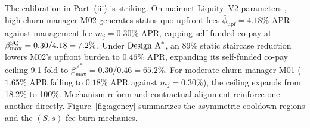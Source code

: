 The calibration in Part~(iii) is striking. On mainnet Liquity~V2 parameters \citep{companion2026}, high-churn manager M02 generates status quo upfront fees $\bar{\phi}_{\mathrm{upf}} = 4.18\%$ APR against management fee $m_j = 0.30\%$ APR, capping self-funded co-pay at $\beta_{\max}^{\mathrm{SQ}} = 0.30/4.18 = 7.2\%$. Under $\textup{Design A}^*$, an 89\% static staircase reduction lowers M02's upfront burden to $0.46\%$ APR, expanding its self-funded co-pay ceiling 9.1-fold to $\beta_{\max}^{A^*} = 0.30/0.46 = 65.2\%$. For moderate-churn manager M01 ($1.65\%$ APR falling to $0.18\%$ APR against $m_j = 0.30\%$), the ceiling expands from 18.2\% to 100\%. Mechanism reform and contractual alignment reinforce one another directly. Figure~\ref{fig:agency} summarizes the asymmetric cooldown regions and the $(S,s)$ fee-burn mechanics.

\begin{figure}[t]
\centering
{}
\end{figure}
